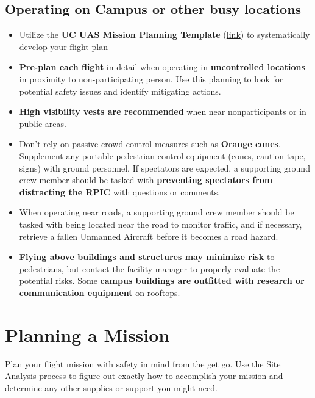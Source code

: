 \documentclass[
  12pt,
]{book}
\providecommand{\tightlist}{%
  \setlength{\itemsep}{0pt}\setlength{\parskip}{0pt}}
\begin{document}
\hypertarget{operating-on-campus-or-other-busy-locations}{%
\subsection{Operating on Campus or other busy locations}\label{operating-on-campus-or-other-busy-locations}}

\begin{itemize}
\tightlist
\item
  Utilize the \textbf{UC UAS Mission Planning Template} (\href{http://ucdrones.github.io/library/mission_planning_template.docx}{link}) to systematically develop your flight plan
\item
  \textbf{Pre-plan each flight} in detail when operating in \textbf{uncontrolled locations} in proximity to non-participating person. Use this planning to look for potential safety issues and identify mitigating actions.
\item
  \textbf{High visibility vests are recommended} when near nonparticipants or in public areas.
\item
  Don't rely on passive crowd control measures such as \textbf{Orange cones}. Supplement any portable pedestrian control equipment (cones, caution tape, signs) with ground personnel. If spectators are expected, a supporting ground crew member should be tasked with \textbf{preventing spectators from distracting the RPIC} with questions or comments.
\item
  When operating near roads, a supporting ground crew member should be tasked with being located near the road to monitor traffic, and if necessary, retrieve a fallen Unmanned Aircraft before it becomes a road hazard.
\item
  \textbf{Flying above buildings and structures may minimize risk} to pedestrians, but contact the facility manager to properly evaluate the potential risks. Some \textbf{campus buildings are outfitted with research or communication equipment} on rooftops.
\end{itemize}

\hypertarget{mission}{%
\section{Planning a Mission}\label{mission}}

Plan your flight mission with safety in mind from the get go. Use the Site Analysis process to figure out exactly how to accomplish your mission and determine any other supplies or support you might need.
\end{document}
